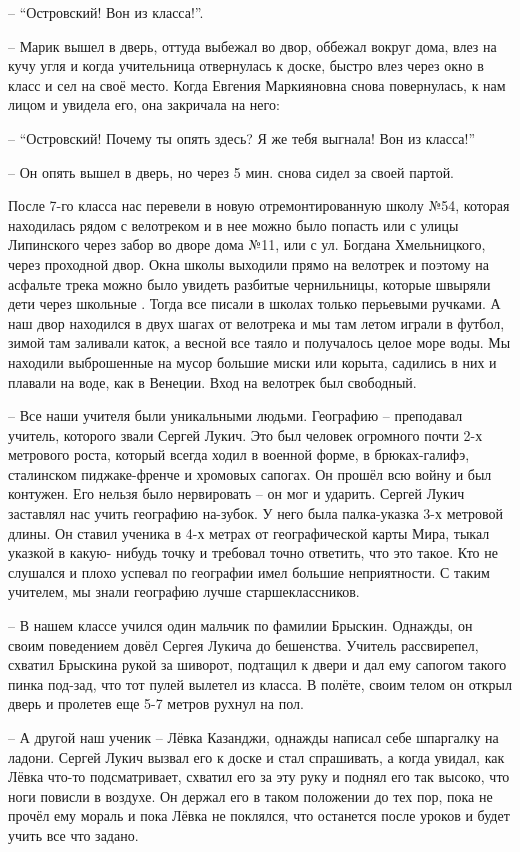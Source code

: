– “Островский! Вон из класса!”.

– Марик вышел в дверь, оттуда выбежал во двор, оббежал вокруг дома, влез на
кучу угля и когда учительница отвернулась к доске, быстро влез через окно в
класс и сел на своё место. Когда Евгения Маркияновна снова повернулась, к нам
лицом и увидела его,  она закричала на него:

– “Островский! Почему ты опять здесь? Я же тебя выгнала!  Вон из класса!”

– Он опять вышел в дверь, но через 5 мин. снова сидел за своей партой.

После 7-го класса нас перевели в новую отремонтированную школу №54, которая
находилась рядом с велотреком и в нее можно было попасть или с улицы Липинского
через забор во дворе дома №11, или с ул. Богдана Хмельницкого, через проходной
двор. Окна школы выходили прямо на велотрек и поэтому  на асфальте трека можно
было увидеть разбитые чернильницы, которые швыряли дети через  школьные . Тогда
все писали в школах только перьевыми ручками. А наш двор находился в двух шагах
от велотрека и мы там летом играли в футбол, зимой там заливали каток, а весной
все таяло и получалось целое море воды.  Мы находили выброшенные на мусор
большие миски или корыта, садились в них и плавали на воде, как в Венеции. Вход
на велотрек был свободный.

– Все наши учителя были уникальными людьми. Географию – преподавал учитель,
которого звали Сергей Лукич. Это был человек огромного почти 2-х метрового
роста, который всегда ходил в военной форме, в брюках-галифэ, сталинском
пиджаке-френче и хромовых сапогах. Он прошёл всю войну и был контужен. Его
нельзя было нервировать – он мог и ударить. Сергей Лукич заставлял нас учить
географию на-зубок. У него была палка-указка 3-х метровой длины. Он ставил
ученика в 4-х метрах от географической карты Мира, тыкал указкой в какую-
нибудь точку и требовал точно ответить, что это такое. Кто не слушался и плохо
успевал по географии имел большие неприятности. С таким учителем, мы знали
географию лучше старшеклассников. 

– В нашем классе учился один мальчик по фамилии Брыскин. Однажды, он своим
поведением довёл Сергея Лукича до бешенства. Учитель  рассвирепел, схватил
Брыскина рукой за шиворот, подтащил к двери и дал ему сапогом такого пинка
под-зад, что тот пулей вылетел из класса. В полёте, своим телом он открыл дверь
и пролетев еще 5-7 метров рухнул на пол.

– А другой наш ученик – Лёвка Казанджи, однажды написал себе шпаргалку на
ладони.  Сергей Лукич вызвал его к доске и стал спрашивать, а когда  увидал,
как Лёвка что-то подсматривает, схватил его за эту руку и поднял его так
высоко, что ноги повисли в воздухе. Он держал его в таком положении до тех пор,
пока не прочёл ему мораль и пока Лёвка не поклялся, что останется после уроков
и будет учить все что задано.

